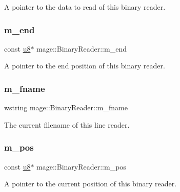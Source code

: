 A pointer to the data to read of this binary reader. \hypertarget{classmage_1_1_binary_reader_a6f676fd4c9ccddd6f1aadae455d01229}{}\label{classmage_1_1_binary_reader_a6f676fd4c9ccddd6f1aadae455d01229} 
\subsubsection{\texorpdfstring{m\+\_\+end}{m\_end}}
{\footnotesize\ttfamily const \hyperlink{namespacemage_a5a362e2d56fc439362a80516ecae7828}{u8}$\ast$ mage\+::\+Binary\+Reader\+::m\+\_\+end\hspace{0.3cm}{\ttfamily [private]}}

A pointer to the end position of this binary reader. \hypertarget{classmage_1_1_binary_reader_a9c97c02d53ce60a9952751ad4f55414f}{}\label{classmage_1_1_binary_reader_a9c97c02d53ce60a9952751ad4f55414f} 
\subsubsection{\texorpdfstring{m\+\_\+fname}{m\_fname}}
{\footnotesize\ttfamily wstring mage\+::\+Binary\+Reader\+::m\+\_\+fname\hspace{0.3cm}{\ttfamily [private]}}

The current filename of this line reader. \hypertarget{classmage_1_1_binary_reader_a7973b89d2e97637ded2c446f0539ec6f}{}\label{classmage_1_1_binary_reader_a7973b89d2e97637ded2c446f0539ec6f} 
\subsubsection{\texorpdfstring{m\+\_\+pos}{m\_pos}}
{\footnotesize\ttfamily const \hyperlink{namespacemage_a5a362e2d56fc439362a80516ecae7828}{u8}$\ast$ mage\+::\+Binary\+Reader\+::m\+\_\+pos\hspace{0.3cm}{\ttfamily [private]}}

A pointer to the current position of this binary reader. 